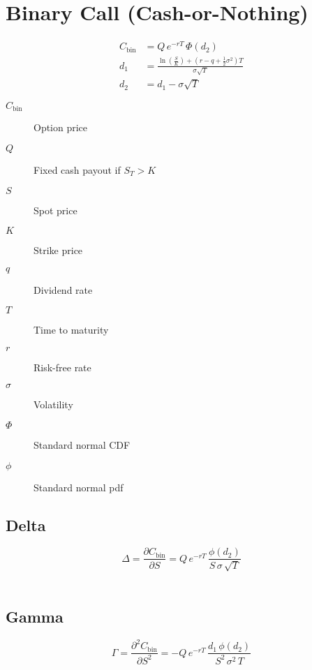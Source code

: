 \documentclass[12pt,a4paper]{article}
\begin{document}
\newpage

\section{Binary Call (Cash-or-Nothing)}

\[
  \begin{aligned}
    C_{\mathrm{bin}} & = Q \, e^{-rT} \,\Phi(d_2) \\
    d_1 & = \frac{\ln\!\left(\tfrac{S}{K}\right) + (r - q + \tfrac{1}{2}\sigma^2)T}{\sigma \sqrt{T}} \\
    d_2 & = d_1 - \sigma \sqrt{T}
  \end{aligned}
\]

\begin{description}
  \item[$C_{\mathrm{bin}}$] Option price
  \item[$Q$] Fixed cash payout if \( S_T > K \)
  \item[$S$] Spot price
  \item[$K$] Strike price
  \item[$q$] Dividend rate
  \item[$T$] Time to maturity
  \item[$r$] Risk-free rate
  \item[$\sigma$] Volatility
  \item[$\Phi$] Standard normal CDF
  \item[$\phi$] Standard normal pdf
\end{description}

\subsection{Delta}
\[
  \boxed{\Delta = \frac{\partial C_{\mathrm{bin}}}{\partial S} 
  = Q\, e^{-rT}\, \frac{\phi(d_2)}{S\,\sigma\,\sqrt{T}}}
\]

\[
  \begin{aligned}
  \end{aligned}
\]

\subsection{Gamma}
\[
  \boxed{\Gamma = \frac{\partial^2 C_{\mathrm{bin}}}{\partial S^2} 
  = -Q\, e^{-rT}\, \frac{d_1\,\phi(d_2)}{S^2\,\sigma^2\,T}}
\]

\[
  \begin{aligned}
  \end{aligned}
\]
\end{document}
